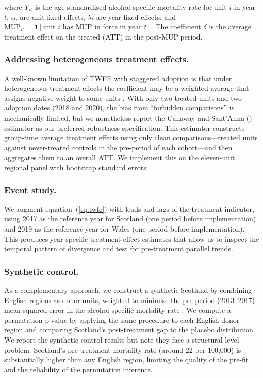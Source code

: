 \documentclass[12pt]{article}
\begin{document}
where $Y_{it}$ is the age-standardised alcohol-specific mortality rate for unit $i$ in year $t$; $\alpha_i$ are unit fixed effects; $\lambda_t$ are year fixed effects; and $\text{MUP}_{it} = \mathbf{1}[\text{unit } i \text{ has MUP in force in year } t]$. The coefficient $\delta$ is the average treatment effect on the treated (ATT) in the post-MUP period.

\subsubsection*{Addressing heterogeneous treatment effects.} A well-known limitation of TWFE with staggered adoption is that under heterogeneous treatment effects the coefficient may be a weighted average that assigns negative weight to some units \citep{Goodman2021,Callaway2021,Sun2021}. With only two treated units and two adoption dates (2018 and 2020), the bias from ``forbidden comparisons'' is mechanically limited, but we nonetheless report the Callaway and Sant'Anna (\citeyear{Callaway2021}) estimator as our preferred robustness specification. This estimator constructs group-time average treatment effects using only clean comparisons---treated units against never-treated controls in the pre-period of each cohort---and then aggregates them to an overall ATT. We implement this on the eleven-unit regional panel with bootstrap standard errors.

\subsubsection*{Event study.} We augment equation~(\ref{eq:twfe}) with leads and lags of the treatment indicator, using 2017 as the reference year for Scotland (one period before implementation) and 2019 as the reference year for Wales (one period before implementation). This produces year-specific treatment-effect estimates that allow us to inspect the temporal pattern of divergence and test for pre-treatment parallel trends.

\subsubsection*{Synthetic control.} As a complementary approach, we construct a synthetic Scotland by combining English regions as donor units, weighted to minimise the pre-period (2013--2017) mean squared error in the alcohol-specific mortality rate \citep{Abadie2010}. We compute a permutation p-value by applying the same procedure to each English donor region and comparing Scotland's post-treatment gap to the placebo distribution. We report the synthetic control results but note they face a structural-level problem: Scotland's pre-treatment mortality rate (around 22 per 100,000) is substantially higher than any English region, limiting the quality of the pre-fit and the reliability of the permutation inference.
\end{document}
